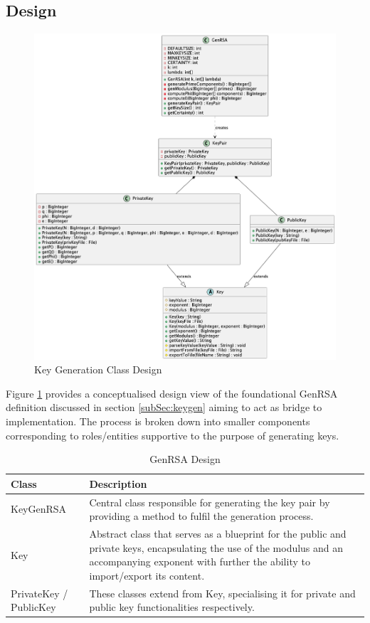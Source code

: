 \documentclass[]{final_report}
\theoremstyle{definition}
\begin{document}
\subsection{Design}
\begin{figure}[H]
    \centering
    \includegraphics[scale=0.48]{KeyGeneration.png}
    \caption{Key Generation Class Design}
    \label{fig:kg}
\end{figure}

Figure \ref{fig:kg} provides a conceptualised design view of the foundational GenRSA definition discussed in section  \ref{subSec:keygen} aiming to act as bridge to implementation. The process is broken down into smaller components corresponding to roles/entities supportive to the purpose of generating keys. 


\begin{table}[H]
    \centering
    \caption{GenRSA Design}
    \label{tab:actors_description}
    \begin{tabular}{|l|p{10cm}|}
    \hline
    \textbf{Class} & \textbf{Description} \\
    \hline
    KeyGenRSA & Central class responsible for generating the key pair by providing a method to fulfil the generation process. \\
    \hline
    Key & Abstract class that serves as a blueprint for the public and private keys, encapsulating the use of the modulus and an accompanying exponent with further the ability to import/export its content. \\
    \hline
    PrivateKey / PublicKey & These classes extend from Key, specialising it for private and public key functionalities respectively. \\
    \hline
    \end{tabular}
\end{table}
\end{document}
